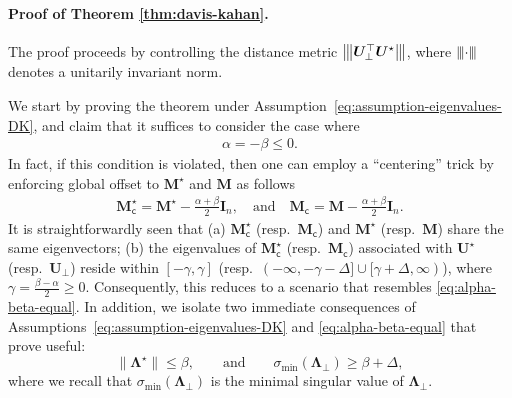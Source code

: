 \paragraph{Proof of Theorem \ref{thm:davis-kahan}.}

The proof proceeds by controlling the distance metric ${\big\vert\kern-0.25ex\big\vert\kern-0.25ex\big\vert \bm{U}_{\perp}^{\top}\bm{U}^{\star} \big\vert\kern-0.25ex\big\vert\kern-0.25ex\big\vert}$, where ${\left\vert\kern-0.25ex\left\vert\kern-0.25ex\left\vert \cdot \right\vert\kern-0.25ex\right\vert\kern-0.25ex\right\vert}$ denotes a unitarily invariant norm.



We start by proving the theorem under Assumption~\eqref{eq:assumption-eigenvalues-DK}, and
	claim that it suffices to consider the case where
	\begin{align}
		\alpha=-\beta \leq 0.
		\label{eq:alpha-beta-equal}
	\end{align}
	In fact, if this condition is violated, then one can employ a ``centering'' trick by enforcing global offset to $\bm{M}^{\star}$ and $\bm{M}$  as follows
	\begin{align*}
		\bm{M}^{\star}_{\mathsf{c}} = \bm{M}^{\star} - \frac{\alpha + \beta}{2} \bm{I}_{n},
		\quad \text{and} \quad
		\bm{M}_{\mathsf{c}} = \bm{M} - \frac{\alpha + \beta}{2} \bm{I}_{n}.
	\end{align*}
	It is straightforwardly seen that (a) $\bm{M}^{\star}_{\mathsf{c}}$ (resp.~$\bm{M}_{\mathsf{c}}$) and $\bm{M}^{\star}$ (resp.~$\bm{M}$) share the same eigenvectors; (b) the eigenvalues of $\bm{M}^{\star}_{\mathsf{c}}$ (resp.~$\bm{M}_{\mathsf{c}}$) associated with $\bm{U}^{\star}$ (resp.~$\bm{U}_{\perp}$) reside within $[-\gamma,\gamma]$ (resp.~$(-\infty, -\gamma - \Delta] \cup [\gamma+\Delta,\infty)$), where $\gamma = \frac{\beta-\alpha}{2} \geq 0$. Consequently, this reduces to a scenario that resembles \eqref{eq:alpha-beta-equal}.   In addition, we isolate two
 immediate consequences of  Assumptions~\eqref{eq:assumption-eigenvalues-DK} and \eqref{eq:alpha-beta-equal} that prove useful:
%
\begin{equation}
	\|\bm{\Lambda}^{\star}\|\leq\beta, 
	\qquad\text{and}\qquad
	\sigma_{\min}(\bm{\Lambda}_{\perp}) \geq \beta+\Delta,
	\label{eq:key-estimate}
\end{equation}
where we recall that $\sigma_{\min}(\bm{\Lambda}_{\perp})$ is the minimal singular value of $\bm{\Lambda}_{\perp}$.

